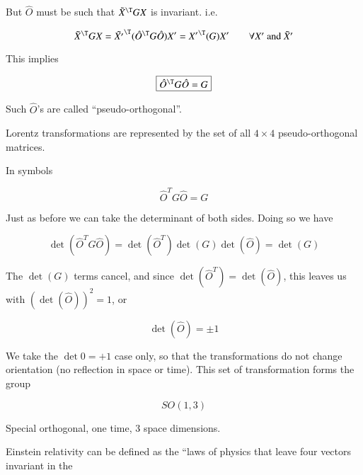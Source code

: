 But $\hat{O}$ must be such that $\tilde{X}^\T G X$ is invariant.  i.e.

\begin{equation}\label{eqn:relativisticElectrodynamicsL6:100}
\tilde{X}^\T G X = {\tilde{X'}}^\T (\hat{O}^\T G \hat{O}) X' = {X'}^\T (G) X' \qquad \mbox{$\forall X'$ and $\tilde{X}'$}
\end{equation}

This implies

\begin{equation}\label{eqn:relativisticElectrodynamicsL6:110}
\boxed{\hat{O}^\T G \hat{O} = G}
\end{equation}

Such $\hat{O}$'s are called ``pseudo-orthogonal''.

Lorentz transformations are represented by the set of all $4 \times 4$ pseudo-orthogonal matrices.

In symbols

\begin{equation}\label{eqn:relativisticElectrodynamicsL6:120}
\hat{O}^T G \hat{O} = G
\end{equation}

Just as before we can take the determinant of both sides.  Doing so we have

\begin{equation}\label{eqn:relativisticElectrodynamicsL6:130}
\det(\hat{O}^T G \hat{O}) = \det(\hat{O}^T) \det(G) \det(\hat{O}) = \det(G)
\end{equation}

The $\det(G)$ terms cancel, and since $\det(\hat{O}^T) = \det(\hat{O})$, this leaves us with $(\det(\hat{O}))^2 = 1$, or

\begin{equation}\label{eqn:relativisticElectrodynamicsL6:140}
\det(\hat{O}) = \pm 1
\end{equation}

We take the $\det 0 = +1$ case only, so that the transformations do not change orientation (no reflection in space or time).  This set of transformation forms the group

\begin{equation*}
SO(1,3)
\end{equation*}

Special orthogonal, one time, 3 space dimensions.

Einstein relativity can be defined as the ``laws of physics that leave four vectors invariant in the

